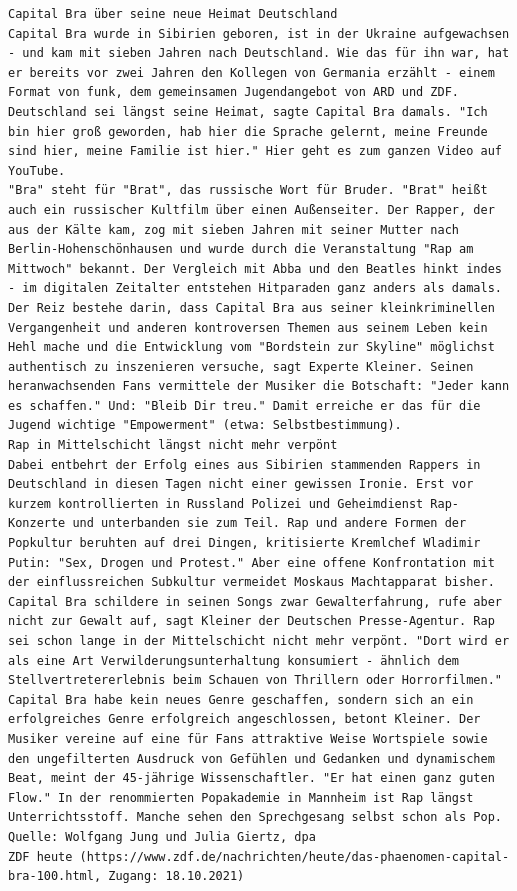 \documentclass[
  letterpaper,
]{scrbook}
\begin{document}
\begin{verbatim}
Capital Bra über seine neue Heimat Deutschland
Capital Bra wurde in Sibirien geboren, ist in der Ukraine aufgewachsen - und kam mit sieben Jahren nach Deutschland. Wie das für ihn war, hat er bereits vor zwei Jahren den Kollegen von Germania erzählt - einem Format von funk, dem gemeinsamen Jugendangebot von ARD und ZDF. Deutschland sei längst seine Heimat, sagte Capital Bra damals. "Ich bin hier groß geworden, hab hier die Sprache gelernt, meine Freunde sind hier, meine Familie ist hier." Hier geht es zum ganzen Video auf YouTube.
"Bra" steht für "Brat", das russische Wort für Bruder. "Brat" heißt auch ein russischer Kultfilm über einen Außenseiter. Der Rapper, der aus der Kälte kam, zog mit sieben Jahren mit seiner Mutter nach Berlin-Hohenschönhausen und wurde durch die Veranstaltung "Rap am Mittwoch" bekannt. Der Vergleich mit Abba und den Beatles hinkt indes - im digitalen Zeitalter entstehen Hitparaden ganz anders als damals.
Der Reiz bestehe darin, dass Capital Bra aus seiner kleinkriminellen Vergangenheit und anderen kontroversen Themen aus seinem Leben kein Hehl mache und die Entwicklung vom "Bordstein zur Skyline" möglichst authentisch zu inszenieren versuche, sagt Experte Kleiner. Seinen heranwachsenden Fans vermittele der Musiker die Botschaft: "Jeder kann es schaffen." Und: "Bleib Dir treu." Damit erreiche er das für die Jugend wichtige "Empowerment" (etwa: Selbstbestimmung).
Rap in Mittelschicht längst nicht mehr verpönt
Dabei entbehrt der Erfolg eines aus Sibirien stammenden Rappers in Deutschland in diesen Tagen nicht einer gewissen Ironie. Erst vor kurzem kontrollierten in Russland Polizei und Geheimdienst Rap-Konzerte und unterbanden sie zum Teil. Rap und andere Formen der Popkultur beruhten auf drei Dingen, kritisierte Kremlchef Wladimir Putin: "Sex, Drogen und Protest." Aber eine offene Konfrontation mit der einflussreichen Subkultur vermeidet Moskaus Machtapparat bisher. Capital Bra schildere in seinen Songs zwar Gewalterfahrung, rufe aber nicht zur Gewalt auf, sagt Kleiner der Deutschen Presse-Agentur. Rap sei schon lange in der Mittelschicht nicht mehr verpönt. "Dort wird er als eine Art Verwilderungsunterhaltung konsumiert - ähnlich dem Stellvertretererlebnis beim Schauen von Thrillern oder Horrorfilmen."
Capital Bra habe kein neues Genre geschaffen, sondern sich an ein erfolgreiches Genre erfolgreich angeschlossen, betont Kleiner. Der Musiker vereine auf eine für Fans attraktive Weise Wortspiele sowie den ungefilterten Ausdruck von Gefühlen und Gedanken und dynamischem Beat, meint der 45-jährige Wissenschaftler. "Er hat einen ganz guten Flow." In der renommierten Popakademie in Mannheim ist Rap längst Unterrichtsstoff. Manche sehen den Sprechgesang selbst schon als Pop.
Quelle: Wolfgang Jung und Julia Giertz, dpa
ZDF heute (https://www.zdf.de/nachrichten/heute/das-phaenomen-capital-bra-100.html, Zugang: 18.10.2021)
\end{verbatim}
\end{document}
